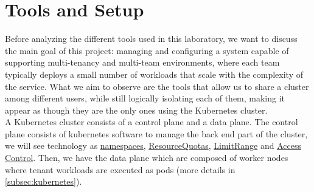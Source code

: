 \section{Tools and Setup}
\label{sec:tools}
Before analyzing the different tools used in this laboratory, we want to discuss the main goal of this project: managing and configuring a system capable of supporting multi-tenancy and multi-team environments, where each team typically deploys a small number of workloads that scale with the complexity of the service. What we aim to observe are the tools that allow us to share a cluster among different users, while still logically isolating each of them, making it appear as though they are the only ones using the Kubernetes cluster. \\
A Kubernetes cluster consists of a control plane and a data plane. The control plane consists of kubernetes software to manage the back end part of the cluster, we will see technology as \hyperref[subsubsec:kubernetes components]{namespaces}, \hyperref[subsec:resource quotas]{ResourceQuotas}, \hyperref[subsec:resource quotas]{LimitRange} and \hyperref[subsec:access control]{Access Control}. Then, we have the data plane which are composed of worker nodes where tenant workloads are executed as pods (more details in \autoref{subsec:kubernetes}).
